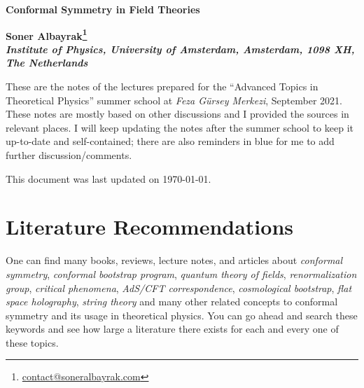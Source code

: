 \documentclass[12pt]{article}
\newcommand\draftnote[1]{{\color{blue} #1}}
\numberwithin{equation}{section}
\begin{document}
	\vspace*{-.6in} \thispagestyle{empty}
	\begin{flushright}
	\end{flushright}
	\vspace{.2in} {\Large
		\begin{center}
			{\bf Conformal Symmetry in Field Theories\vspace{.1in}}
		\end{center}
	}
	\vspace{.2in}
	\begin{center}
		{\bf 
			Soner Albayrak\footnote{\href{mailto:contact@soneralbayrak.com}{contact@soneralbayrak.com}}
		\\
		\vspace{.2in} 
		{\it  Institute of Physics, University of Amsterdam, Amsterdam, 1098 XH, The Netherlands}}
	\end{center}
	
	\vspace{.2in}

		These are the notes of the lectures prepared for the ``Advanced Topics in Theoretical Physics''  summer school at \emph{Feza Gürsey Merkezi}, September 2021. These notes are mostly based on other discussions and I provided the sources  in relevant places. I will keep updating the notes after the summer school to keep it up-to-date and self-contained; there are also reminders \draftnote{in blue} for me to add further discussion/comments.
		\par This document was last updated on \today.
	
	\newpage

\tableofcontents
\clearpage
{}%
\section*{Literature Recommendations}
One can find many books, reviews, lecture notes, and articles about \emph{conformal symmetry}, \emph{conformal bootstrap program}, \emph{quantum theory of fields}, \emph{renormalization group}, \emph{critical phenomena}, \emph{AdS/CFT correspondence}, \emph{cosmological bootstrap}, \emph{flat space holography}, \emph{string theory} and many other related concepts to conformal symmetry and its usage in theoretical physics. You can go ahead and search these keywords and see how large a literature there exists for each and every one of these topics.
\end{document}

